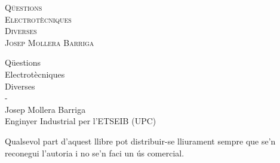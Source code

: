 \pagecolor{colorPortada}


\begin{titlepage}
   \parbox{18cm}{\fontsize{60pt}{60pt}\selectfont\color{red}\scshape%
                 Qüestions\\[25pt] Electrotècniques\\[25pt] Diverses\\[80pt]%
                 \fontsize{40pt}{40pt}\selectfont{}Josep Mollera Barriga}
   \vspace*{10mm}
   \begin{center}
        \fontsize{10pt}{11pt}\selectfont
        
   \end{center}
\end{titlepage}

\pagecolor{white}

\cleardoublepage\thispagestyle{empty}
{\fontsize{60pt}{60pt}\selectfont%
Qüestions\\[25pt]
Electrotècniques\\[25pt]
Diverses\\[90pt]}
{\fontsize{40pt}{40pt}-\the\year \hspace{5mm}{\Huge(versió 11.6)}\\[85pt]
Josep Mollera Barriga\\[25pt]}
{\fontsize{25pt}{25pt}\selectfont
Enginyer Industrial per l'ETSEIB (UPC)}
\vfill
{\fontsize{15pt}{20pt}\selectfont
\begin{list}{}
    {\setlength{\labelwidth}{7mm} \setlength{\leftmargin}{7mm}\setlength{\labelsep}{2mm}}
    \item[\faCopyright]  Qualsevol part d'aquest llibre  pot  distribuir-se lliurament
                         sempre que se’n reconegui l’autoria i no se’n faci un ús comercial.
\end{list}}

